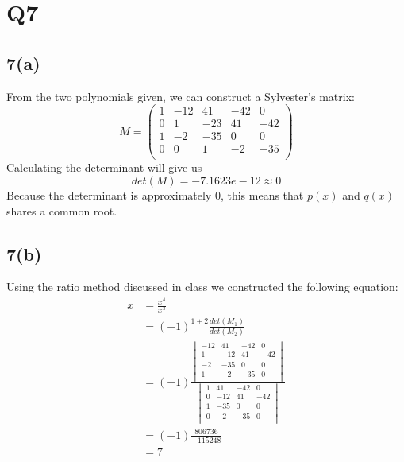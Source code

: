 \documentclass{article}
\begin{document}
\section{Q7}
\subsection*{7(a)}
From the two polynomials given, we can construct a Sylvester's matrix:
\begin{equation*}
M = 
\begin{pmatrix}
1 &-12 &41 &-42& 0\\
0 &1   &-23 & 41 & -42\\
1& -2& -35& 0& 0\\
0& 0& 1& -2& -35\\ 
\end{pmatrix}
\end{equation*}
Calculating the determinant will give us
\begin{equation*}
det(M) = -7.1623e-12 \approx 0
\end{equation*}
Because the determinant is approximately 0, this means that $p(x)$ and $q(x)$ shares a common root.
\subsection{7(b)}
Using the ratio method discussed in class we constructed the following equation:
\begin{equation*}
\begin{aligned}
x &= \frac{x^4}{x^3} \\
&=(-1)^{1+2}\frac{det(M_1)}{det(M_2)} \\
&=(-1)\frac{
	\begin{vmatrix}
	-12 & 41 &-42 &  0\\
	  1 &-12 & 41 &-42\\
	 -2 &-35 &  0 &  0\\
	  1 & -2 &-35 &  0\\
	\end{vmatrix}
}{
	\begin{vmatrix}
	  1 & 41 &-42 &  0\\
	  0 &-12 & 41 &-42\\
	  1 &-35 &  0 &  0\\
	  0 & -2 &-35 &  0\\	
	\end{vmatrix}
}\\
&=(-1)\frac{806736}{-115248}\\
&=7
\end{aligned}
\end{equation*}
\end{document}
